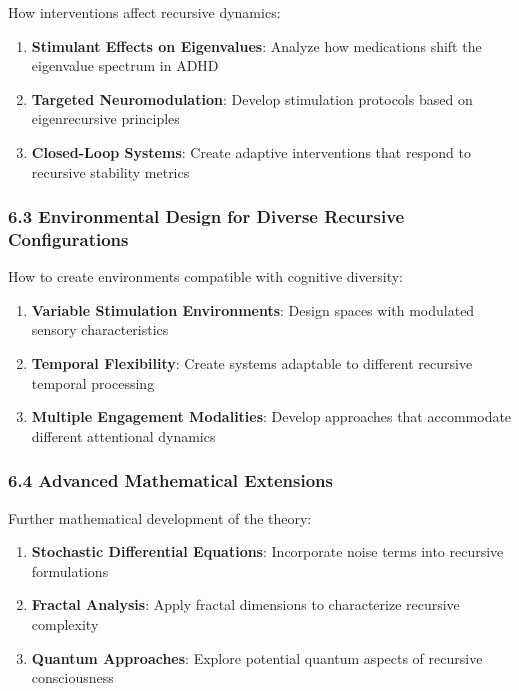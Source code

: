 \documentclass[
]{article}
\providecommand{\tightlist}{%
  \setlength{\itemsep}{0pt}\setlength{\parskip}{0pt}}
\begin{document}
How interventions affect recursive dynamics:

\begin{enumerate}
\def\labelenumi{\arabic{enumi}.}
\tightlist
\item
  \textbf{Stimulant Effects on Eigenvalues}: Analyze how medications
  shift the eigenvalue spectrum in ADHD
\item
  \textbf{Targeted Neuromodulation}: Develop stimulation protocols based
  on eigenrecursive principles
\item
  \textbf{Closed-Loop Systems}: Create adaptive interventions that
  respond to recursive stability metrics
\end{enumerate}

\subsubsection{6.3 Environmental Design for Diverse Recursive
Configurations}\label{environmental-design-for-diverse-recursive-configurations}

How to create environments compatible with cognitive diversity:

\begin{enumerate}
\def\labelenumi{\arabic{enumi}.}
\tightlist
\item
  \textbf{Variable Stimulation Environments}: Design spaces with
  modulated sensory characteristics
\item
  \textbf{Temporal Flexibility}: Create systems adaptable to different
  recursive temporal processing
\item
  \textbf{Multiple Engagement Modalities}: Develop approaches that
  accommodate different attentional dynamics
\end{enumerate}

\subsubsection{6.4 Advanced Mathematical
Extensions}\label{advanced-mathematical-extensions}

Further mathematical development of the theory:

\begin{enumerate}
\def\labelenumi{\arabic{enumi}.}
\tightlist
\item
  \textbf{Stochastic Differential Equations}: Incorporate noise terms
  into recursive formulations
\item
  \textbf{Fractal Analysis}: Apply fractal dimensions to characterize
  recursive complexity
\item
  \textbf{Quantum Approaches}: Explore potential quantum aspects of
  recursive consciousness
\end{enumerate}
\end{document}

